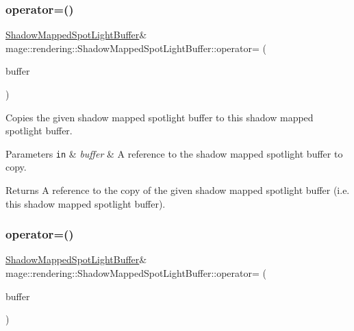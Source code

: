 \subsubsection{\texorpdfstring{operator=()}{operator=()}\hspace{0.1cm}{\footnotesize\ttfamily [1/2]}}
{\footnotesize\ttfamily \mbox{\hyperlink{structmage_1_1rendering_1_1_shadow_mapped_spot_light_buffer}{Shadow\+Mapped\+Spot\+Light\+Buffer}}\& mage\+::rendering\+::\+Shadow\+Mapped\+Spot\+Light\+Buffer\+::operator= (\begin{DoxyParamCaption}\item[{const \mbox{\hyperlink{structmage_1_1rendering_1_1_shadow_mapped_spot_light_buffer}{Shadow\+Mapped\+Spot\+Light\+Buffer}} \&}]{buffer }\end{DoxyParamCaption})\hspace{0.3cm}{\ttfamily [default]}}

Copies the given shadow mapped spotlight buffer to this shadow mapped spotlight buffer.


\begin{DoxyParams}[1]{Parameters}
\mbox{\tt in}  & {\em buffer} & A reference to the shadow mapped spotlight buffer to copy. \\
\hline
\end{DoxyParams}
\begin{DoxyReturn}{Returns}
A reference to the copy of the given shadow mapped spotlight buffer (i.\+e. this shadow mapped spotlight buffer). 
\end{DoxyReturn}
\mbox{\label{structmage_1_1rendering_1_1_shadow_mapped_spot_light_buffer_ae2687b41af138b43fc814883310a877b}} 
\subsubsection{\texorpdfstring{operator=()}{operator=()}\hspace{0.1cm}{\footnotesize\ttfamily [2/2]}}
{\footnotesize\ttfamily \mbox{\hyperlink{structmage_1_1rendering_1_1_shadow_mapped_spot_light_buffer}{Shadow\+Mapped\+Spot\+Light\+Buffer}}\& mage\+::rendering\+::\+Shadow\+Mapped\+Spot\+Light\+Buffer\+::operator= (\begin{DoxyParamCaption}\item[{\mbox{\hyperlink{structmage_1_1rendering_1_1_shadow_mapped_spot_light_buffer}{Shadow\+Mapped\+Spot\+Light\+Buffer}} \&\&}]{buffer }\end{DoxyParamCaption})\hspace{0.3cm}{\ttfamily [default]}}

